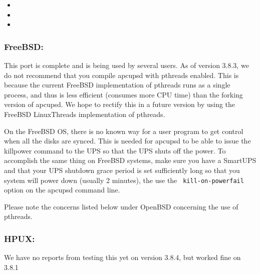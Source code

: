 \begin{itemize}
\item 
\item 
\item 
\end{itemize}

\label{FreeBSD}

\subsubsection*{FreeBSD:}

\label{index-FreeBSD-36}
\label{index-OS_002c-FreeBSD-37}
This port is complete and is being used by several users. As of version 3.8.3,
we do not recommend that you compile apcupsd with pthreads enabled. This is
because the current FreeBSD implementation of pthreads runs as a single
process, and thus is less efficient (consumes more CPU time) than the forking
version of apcupsd. We hope to rectify this in a future version by using the
FreeBSD LinuxThreads implementation of pthreads.  

On the FreeBSD OS, there is no known way for a user program to get control
when all the disks are synced. This is needed for apcupsd to be able to issue
the killpower command to the UPS so that the UPS shuts off the power. To
accomplish the same thing on FreeBSD systems, make sure you have a SmartUPS
and that your UPS shutdown grace period is set sufficiently long so that you
system will power down (usually 2 minutes), the use the {\tt
kill-on-powerfail} option on the apcupsd command line.  

Please note the concerns listed below under OpenBSD concerning the use of
pthreads. 

\label{HPUX}

\subsubsection*{HPUX:}

\label{index-HPUX-38}
\label{index-OS_002c-HPUX-39}
We have no reports from testing this yet on version 3.8.4, but worked fine on
3.8.1 

